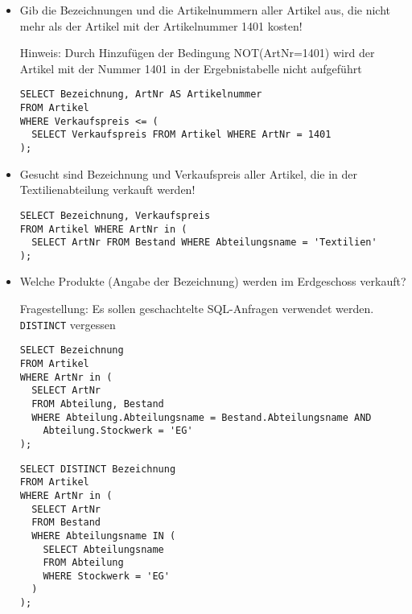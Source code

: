 \documentclass{lehramt-informatik-aufgabe}
\begin{document}
\begin{enumerate}
\begin{itemize}


\item Gib die Bezeichnungen und die Artikelnummern aller Artikel aus,
die nicht mehr als der Artikel mit der Artikelnummer 1401 kosten!

\begin{antwort}[muster]
Hinweis: Durch Hinzufügen der Bedingung NOT(ArtNr=1401) wird der Artikel
mit der Nummer 1401 in der Ergebnistabelle nicht aufgeführt
\begin{verbatim}
SELECT Bezeichnung, ArtNr AS Artikelnummer
FROM Artikel
WHERE Verkaufspreis <= (
  SELECT Verkaufspreis FROM Artikel WHERE ArtNr = 1401
);
\end{verbatim}
\end{antwort}


\item Gesucht sind Bezeichnung und Verkaufspreis aller Artikel, die in
der Textilienabteilung verkauft werden!

\begin{antwort}[muster]
\begin{verbatim}
SELECT Bezeichnung, Verkaufspreis
FROM Artikel WHERE ArtNr in (
  SELECT ArtNr FROM Bestand WHERE Abteilungsname = 'Textilien'
);
\end{verbatim}
\end{antwort}


\item Welche Produkte (Angabe der Bezeichnung) werden im Erdgeschoss
verkauft?

\begin{antwort}[falsch]
Fragestellung: Es sollen geschachtelte SQL-Anfragen verwendet werden.
\verb|DISTINCT| vergessen
\begin{verbatim}
SELECT Bezeichnung
FROM Artikel
WHERE ArtNr in (
  SELECT ArtNr
  FROM Abteilung, Bestand
  WHERE Abteilung.Abteilungsname = Bestand.Abteilungsname AND
    Abteilung.Stockwerk = 'EG'
);
\end{verbatim}
\end{antwort}

\begin{antwort}[muster]
\begin{verbatim}
SELECT DISTINCT Bezeichnung
FROM Artikel
WHERE ArtNr in (
  SELECT ArtNr
  FROM Bestand
  WHERE Abteilungsname IN (
    SELECT Abteilungsname
    FROM Abteilung
    WHERE Stockwerk = 'EG'
  )
);
\end{verbatim}
\end{antwort}


\end{itemize}
\end{enumerate}
\end{document}
